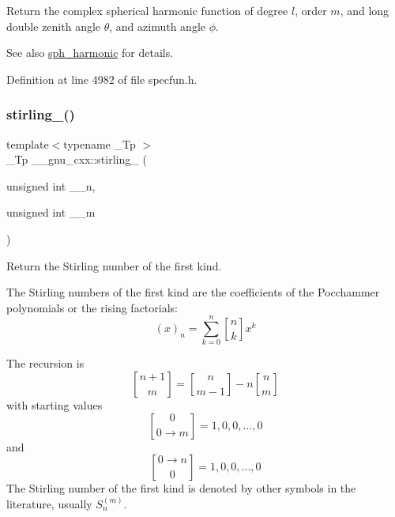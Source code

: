 Return the complex spherical harmonic function of degree $ l $, order $ m $, and {\ttfamily long double} zenith angle $ \theta $, and azimuth angle $ \phi $.

\begin{DoxySeeAlso}{See also}
\hyperlink{group__gnu__math__spec__func_gacbff28988d5d36f0c3b3fe03d4f57896}{sph\+\_\+harmonic} for details. 
\end{DoxySeeAlso}


Definition at line 4982 of file specfun.\+h.

\mbox{\label{group__gnu__math__spec__func_ga2b955dac7d2c5125f2091eaeb25c8ad2}} 
\subsubsection{\texorpdfstring{stirling\+\_()}{stirling\_1()}}
{\footnotesize\ttfamily template$<$typename \+\_\+\+Tp $>$ \\
\+\_\+\+Tp \+\_\+\+\_\+gnu\+\_\+cxx\+::stirling\+\_ (\begin{DoxyParamCaption}\item[{unsigned int}]{\+\_\+\+\_\+n,  }\item[{unsigned int}]{\+\_\+\+\_\+m }\end{DoxyParamCaption})\hspace{0.3cm}{\ttfamily [inline]}}

Return the Stirling number of the first kind.

The Stirling numbers of the first kind are the coefficients of the Pocchammer polynomials or the rising factorials\+: \[ \newcommand{\stirling}[2]{\genfrac{[}{]}{0pt}{0}{#1}{#2}} (x)_n = \sum_{k=0}^{n} \stirling{n}{k} x^k \]

The recursion is \[ \newcommand{\stirling}[2]{\genfrac{[}{]}{0pt}{0}{#1}{#2}} \stirling{n+1}{m} = \stirling{n}{m-1} - n \stirling{n}{m} \] with starting values \[ \newcommand{\stirling}[2]{\genfrac{[}{]}{0pt}{0}{#1}{#2}} \stirling{0}{0\rightarrow m} = {1, 0, 0, ..., 0} \] and \[ \newcommand{\stirling}[2]{\genfrac{[}{]}{0pt}{0}{#1}{#2}} \stirling{0\rightarrow n}{0} = {1, 0, 0, ..., 0} \] The Stirling number of the first kind is denoted by other symbols in the literature, usually $ S_n^{(m)} $.

